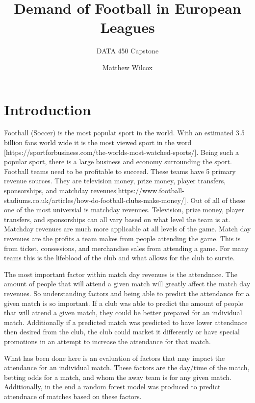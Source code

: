 \documentclass[
  letterpaper,
  DIV=11,
  numbers=noendperiod]{scrartcl}
\title{Demand of Football in European Leagues}
\subtitle{DATA 450 Capstone}
\author{Matthew Wilcox}
\date{}
\begin{document}
\maketitle
\ifdefined\Shaded\renewenvironment{Shaded}{\begin{tcolorbox}[interior hidden, enhanced, sharp corners, frame hidden, boxrule=0pt, breakable, borderline west={3pt}{0pt}{shadecolor}]}{\end{tcolorbox}}\fi

\hypertarget{introduction}{%
\section{Introduction}\label{introduction}}

Football (Soccer) is the most populat sport in the world. With an
estimated 3.5 billion fans world wide it is the most viewed sport in the
word {[}https://sportforbusiness.com/the-worlds-most-watched-sports/{]}.
Being such a popular sport, there is a large business and economy
surrounding the sport. Football teams need to be profitable to succeed.
These teams have 5 primary revenue sources. They are television money,
prize money, player transfers, sponsorships, and matchday
revenues{[}https://www.football-stadiums.co.uk/articles/how-do-football-clubs-make-money/{]}.
Out of all of these one of the most universial is matchday revenues.
Television, prize money, player transfers, and sponsorships can all vary
based on what level the team is at. Matchday revenues are much more
applicable at all levels of the game. Match day revenues are the profits
a team makes from people attending the game. This is from ticket,
consessions, and merchandise sales from attending a game. For many teams
this is the lifeblood of the club and what allows for the club to
survie.

The most important factor within match day revenues is the attendnace.
The amount of people that will attend a given match will greatly affect
the match day revenues. So understanding factors and being able to
predict the attendance for a given match is so important. If a club was
able to predict the amount of people that will attend a given match,
they could be better prepared for an individual match. Additionally if a
predicted match was predicted to have lower attendnace then desired from
the club, the club could market it differently or have special
promotions in an attempt to increase the attendance for that match.

What has been done here is an evaluation of factors that may impact the
attendance for an individual match. These factors are the day/time of
the match, betting odds for a match, and whom the away team is for any
given match. Additionally, in the end a random forest model was produced
to predict attendnace of matches based on these factors.
\end{document}
